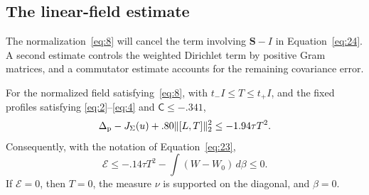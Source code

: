 \subsection{The linear-field estimate}

The normalization~\eqref{eq:8} will cancel the term involving
\(\mathbf S-I\) in Equation~\eqref{eq:24}.  A second estimate controls the
weighted Dirichlet term by positive Gram matrices, and a commutator
estimate accounts for the remaining covariance error.

\begin{proposition}\label{prop:linear-field-bound}
For the normalized field satisfying~\eqref{eq:8}, with
\(t_-I\le T\le t_+I\), and the fixed profiles satisfying
\eqref{eq:2}--\eqref{eq:4} and \(\mathsf C\le-.341\),
\[
 \Delta_{\rm p}-J_\Sigma(u)+.80\|[L,T]\|_2^2
       \le -1.94\tau T^2.
\]
Consequently, with the notation of Equation~\eqref{eq:23},
\[
 \mathcal E\le -.14\tau T^2-\int(W-W_0)\,d\beta\le0.
\]
If \(\mathcal E=0\), then \(T=0\), the measure \(\nu\) is supported on
the diagonal, and \(\beta=0\).
\end{proposition}


